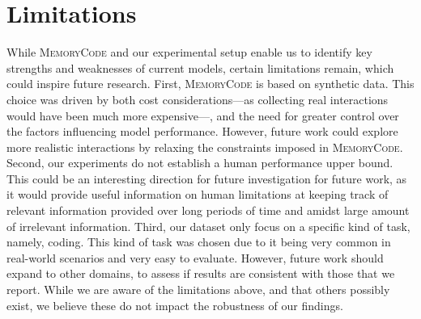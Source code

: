 \section*{Limitations}





While \textsc{MemoryCode} and our experimental setup enable us to identify key strengths and weaknesses of current models, certain limitations remain, which could inspire future research. 
First, \textsc{MemoryCode} is based on synthetic data. 
This choice was driven by both cost considerations---as collecting real interactions would have been much more expensive---, and the need for greater control over the factors influencing model performance. 
However, future work could explore more realistic interactions by relaxing the constraints imposed in \textsc{MemoryCode}. 
Second, our experiments do not establish a human performance upper bound. This could be an interesting direction for future investigation for future work, as it would provide useful information on human limitations at keeping track of relevant information provided over long periods of time and amidst large amount of irrelevant information.
Third, our dataset only focus on a specific kind of task, namely, coding. This kind of task was chosen due to it being very common in real-world scenarios and very easy to evaluate. However, future work should expand to other domains, to assess if results are consistent with those that we report. 
While we are aware of the limitations above, and that others possibly exist, we believe these do not impact the robustness of our findings.
